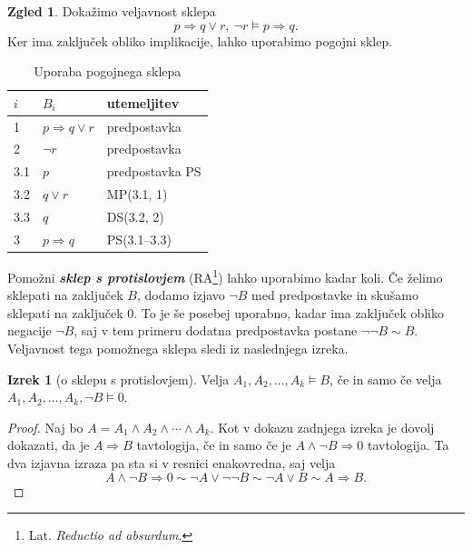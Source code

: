 \documentclass[11pt]{book}
\def\definicija{\color{rdeca}\bf\em}
\theoremstyle{definition}
\theoremstyle{zgled}
\newtheorem*{zgled}{Zgled}
\theoremstyle{odprtproblem}
\theoremstyle{domacanaloga}
\newenvironment{dokaz}
    {\color{siva}\begin{proof}}
    {\end{proof}}
\theoremstyle{izrek}
\newtheorem*{izrek}{Izrek}
\begin{document}
\begin{zgled}
Dokažimo veljavnost sklepa
\[
    p \Rightarrow q \lor r, \ \lnot r \models p \Rightarrow q.
\]
Ker ima zaključek obliko implikacije, lahko uporabimo pogojni sklep.

\begin{table}[h]
    \centering
    \begin{tabular}{lll}
        $i$ & $B_i$ & utemeljitev \\ \hline
        1 & $p \Rightarrow q \lor r$ & predpostavka \\
        2 & $\lnot r$ & predpostavka \\
        3.1 & $p$ & predpostavka PS \\
        3.2 & $q \lor r$ & MP(3.1, 1) \\
        3.3 & $q$ & DS(3.2, 2) \\
        3 & \underline{$p \Rightarrow q$} & PS(3.1--3.3) \\
    \end{tabular}
    \caption{Uporaba pogojnega sklepa}
\end{table}
\end{zgled}

Pomožni {\definicija sklep s protislovjem} (RA\footnote{Lat. \emph{Reductio ad absurdum}.}) lahko uporabimo kadar koli. Če želimo sklepati na zaključek $B$, dodamo izjavo $\lnot B$ med predpostavke in skušamo sklepati na zaključek $0$. To je še posebej uporabno, kadar ima zaključek obliko negacije $\lnot B$, saj v tem primeru dodatna predpostavka postane $\lnot \lnot B \sim B$. Veljavnost tega pomožnega sklepa sledi iz naslednjega izreka.

\begin{izrek}[o sklepu s protislovjem]
Velja $A_1, A_2, \dots, A_k \models B$, če in samo če velja $A_1, A_2, \dots, A_k, \lnot B \models 0$.
\end{izrek}
\begin{dokaz}
Naj bo $A = A_1 \land A_2 \land \cdots \land A_k$. Kot v dokazu zadnjega izreka je dovolj dokazati, da je $A \Rightarrow B$ tavtologija, če in samo če je $A \land \lnot B \Rightarrow 0$ tavtologija. Ta dva izjavna izraza pa sta si v resnici enakovredna, saj velja
\[
    A \land \lnot B \Rightarrow 0 \sim
    \lnot A \lor \lnot \lnot B \sim
    \lnot A \lor B \sim
    A \Rightarrow B.
\]
\end{dokaz}
\end{document}
